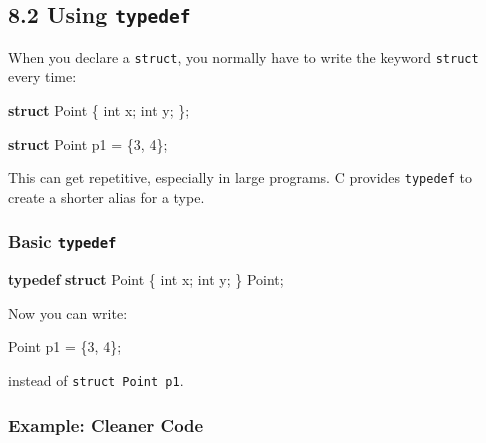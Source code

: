 \documentclass[
  letterpaper,
  DIV=11,
  numbers=noendperiod]{scrreprt}
\newenvironment{Shaded}{\begin{snugshade}}{\end{snugshade}}
\newcommand{\DataTypeTok}[1]{\textcolor[rgb]{0.68,0.00,0.00}{#1}}
\newcommand{\DecValTok}[1]{\textcolor[rgb]{0.68,0.00,0.00}{#1}}
\newcommand{\KeywordTok}[1]{\textcolor[rgb]{0.00,0.23,0.31}{\textbf{#1}}}
\newcommand{\NormalTok}[1]{\textcolor[rgb]{0.00,0.23,0.31}{#1}}
\newcommand{\OperatorTok}[1]{\textcolor[rgb]{0.37,0.37,0.37}{#1}}
\begin{document}
\subsection{\texorpdfstring{8.2 Using
\texttt{typedef}}{8.2 Using typedef}}\label{using-typedef}

When you declare a \texttt{struct}, you normally have to write the
keyword \texttt{struct} every time:

\begin{Shaded}
\begin{Highlighting}[]
\KeywordTok{struct}\NormalTok{ Point }\OperatorTok{\{}
    \DataTypeTok{int}\NormalTok{ x}\OperatorTok{;}
    \DataTypeTok{int}\NormalTok{ y}\OperatorTok{;}
\OperatorTok{\};}

\KeywordTok{struct}\NormalTok{ Point p1 }\OperatorTok{=} \OperatorTok{\{}\DecValTok{3}\OperatorTok{,} \DecValTok{4}\OperatorTok{\};}
\end{Highlighting}
\end{Shaded}

This can get repetitive, especially in large programs. C provides
\texttt{typedef} to create a shorter alias for a type.

\subsubsection{\texorpdfstring{Basic
\texttt{typedef}}{Basic typedef}}\label{basic-typedef}

\begin{Shaded}
\begin{Highlighting}[]
\KeywordTok{typedef} \KeywordTok{struct}\NormalTok{ Point }\OperatorTok{\{}
    \DataTypeTok{int}\NormalTok{ x}\OperatorTok{;}
    \DataTypeTok{int}\NormalTok{ y}\OperatorTok{;}
\OperatorTok{\}}\NormalTok{ Point}\OperatorTok{;}
\end{Highlighting}
\end{Shaded}

Now you can write:

\begin{Shaded}
\begin{Highlighting}[]
\NormalTok{Point p1 }\OperatorTok{=} \OperatorTok{\{}\DecValTok{3}\OperatorTok{,} \DecValTok{4}\OperatorTok{\};}
\end{Highlighting}
\end{Shaded}

instead of \texttt{struct\ Point\ p1}.

\subsubsection{Example: Cleaner Code}\label{example-cleaner-code}
\end{document}
